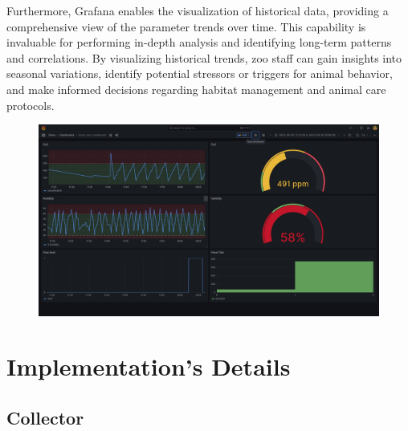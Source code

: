 \documentclass[parskip=full]{report}
\begin{document}
Furthermore, Grafana enables the visualization of historical data, providing a comprehensive view of the parameter trends over time. This capability is invaluable for performing in-depth analysis and identifying long-term patterns and correlations. By visualizing historical trends, zoo staff can gain insights into seasonal variations, identify potential stressors or triggers for animal behavior, and make informed decisions regarding habitat management and animal care protocols.

\begin{figure}[H]
	\centering
	\includegraphics[width=0.9\linewidth]{"assets/grafana iot"}
	\caption{}
	\label{fig:grafana-iot}
\end{figure}


\chapter{Implementation's Details}
\section{Collector}


\end{document}

